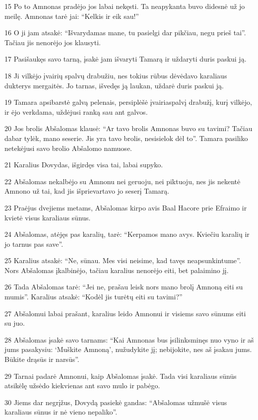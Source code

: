 \par 15 Po to Amnonas pradėjo jos labai nekęsti. Ta neapykanta buvo didesnė už jo meilę. Amnonas tarė jai: “Kelkis ir eik sau!” 
\par 16 O ji jam atsakė: “Išvarydamas mane, tu pasielgi dar pikčiau, negu prieš tai”. Tačiau jis nenorėjo jos klausyti. 
\par 17 Pasišaukęs savo tarną, įsakė jam išvaryti Tamarą ir uždaryti duris paskui ją. 
\par 18 Ji vilkėjo įvairių spalvų drabužiu, nes tokius rūbus dėvėdavo karaliaus dukterys mergaitės. Jo tarnas, išvedęs ją laukan, uždarė duris paskui ją. 
\par 19 Tamara apsibarstė galvą pelenais, persiplėšė įvairiaspalvį drabužį, kurį vilkėjo, ir ėjo verkdama, uždėjusi ranką sau ant galvos. 
\par 20 Jos brolis Abšalomas klausė: “Ar tavo brolis Amnonas buvo su tavimi? Tačiau dabar tylėk, mano seserie. Jis yra tavo brolis, nesisielok dėl to”. Tamara pasiliko netekėjusi savo brolio Abšalomo namuose. 
\par 21 Karalius Dovydas, išgirdęs visa tai, labai supyko. 
\par 22 Abšalomas nekalbėjo su Amnonu nei geruoju, nei piktuoju, nes jis nekentė Amnono už tai, kad jis išprievartavo jo seserį Tamarą. 
\par 23 Praėjus dvejiems metams, Abšalomas kirpo avis Baal Hacore prie Efraimo ir kvietė visus karaliaus sūnus. 
\par 24 Abšalomas, atėjęs pas karalių, tarė: “Kerpamos mano avys. Kviečiu karalių ir jo tarnus pas save”. 
\par 25 Karalius atsakė: “Ne, sūnau. Mes visi neisime, kad tavęs neapsunkintume”. Nors Abšalomas įkalbinėjo, tačiau karalius nenorėjo eiti, bet palaimino jį. 
\par 26 Tada Abšalomas tarė: “Jei ne, prašau leisk nors mano brolį Amnoną eiti su mumis”. Karalius atsakė: “Kodėl jis turėtų eiti su tavimi?” 
\par 27 Abšalomui labai prašant, karalius leido Amnonui ir visiems savo sūnums eiti su juo. 
\par 28 Abšalomas įsakė savo tarnams: “Kai Amnonas bus įsilinksminęs nuo vyno ir aš jums pasakysiu: ‘Muškite Amnoną’, nužudykite jį; nebijokite, nes aš įsakau jums. Būkite drąsūs ir narsūs”. 
\par 29 Tarnai padarė Amnonui, kaip Abšalomas įsakė. Tada visi karaliaus sūnūs atsikėlę užsėdo kiekvienas ant savo mulo ir pabėgo. 
\par 30 Jiems dar negrįžus, Dovydą pasiekė gandas: “Abšalomas užmušė visus karaliaus sūnus ir nė vieno nepaliko”. 
